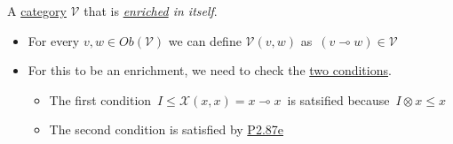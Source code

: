 A \href{doc/1 math/Seven Sketches in Compositionality/Chapter 2: Resource theories/3 Enrichment/1 V-categories/1 V-category}{category} $\mathcal{V}$ that is \emph{\href{doc/1 math/Seven Sketches in Compositionality/Chapter 2: Resource theories/3 Enrichment/1 V-categories/1 V-category}{enriched} in itself}.

\begin{itemize}
    \item  For every $v,w \in Ob(\mathcal{V})$ we can define $\mathcal{V}(v,w)$ as \,$(v \multimap w) \in \mathcal{V}$\,
    \item For this to be an enrichment, we need to check the \href{doc/1 math/Seven Sketches in Compositionality/Chapter 2: Resource theories/3 Enrichment/1 V-categories/1 V-category}{two conditions}.
          \begin{itemize}
            \item The first condition \,$I \leq \mathcal{X}(x,x) = x \multimap x$\, is satsified because \,$I \otimes x \leq x$\,
            \item The second condition is satisfied by \href{doc/1 math/Seven Sketches in Compositionality/Chapter 2: Resource theories/5 Computing presented V-categories with matrix mult/1 Monoidal closed preorders/5 SMP currying}{P2.87e}

          \end{itemize}
  \end{itemize}
